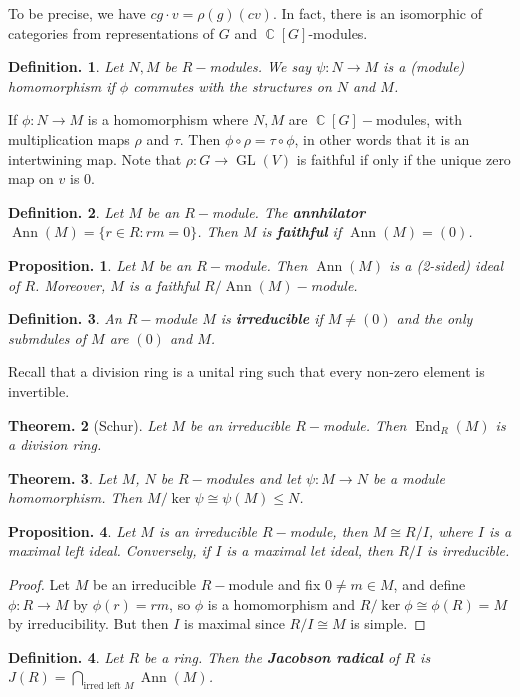 \documentclass[11pt, a4paper]{memoir}
\DeclareMathOperator{\C}{{\mathbb{C}}}
\theoremstyle{change}
\newtheorem{theorem}{Theorem.}[section]
\newtheorem{proposition}[theorem]{Proposition.}
\theoremstyle{plain}
\theoremstyle{nonumberplain}
\newtheorem{definition}{Definition.}
\newtheorem{proof}{Proof}
\DeclareMathOperator{\Ann}{Ann}
\DeclareMathOperator{\End}{End}
\DeclareMathOperator{\GL}{GL}
\numberwithin{equation}{section}
\begin{document}
To be precise, we have $c g\cdot v=\rho(g)(c v)$.
In fact, there is an isomorphic of categories from representations of $G$ and $\C[G]$-modules.
\begin{definition}
    Let $N,M$ be $R-$modules.
    We say $\psi:N\to M$ is a (module) homomorphism if $\phi$ commutes with the structures on $N$ and $M$.
\end{definition}
If $\phi:N\to M$ is a homomorphism where $N,M$ are $\C[G]-$modules, with multiplication maps $\rho$ and $\tau$.
Then $\phi\circ\rho=\tau\circ\phi$, in other words that it is an intertwining map.
Note that $\rho:G\to\GL(V)$ is faithful if only if the unique zero map on $v$ is $0$.
\begin{definition}
    Let $M$ be an $R-$module.
    The \textbf{annhilator} $\Ann(M)=\{r\in R:rm=0\}$.
    Then $M$ is \textbf{faithful} if $\Ann(M)=(0)$.
\end{definition}
\begin{proposition}
    Let $M$ be an $R-$module.
    Then $\Ann(M)$ is a (2-sided) ideal of $R$.
    Moreover, $M$ is a faithful $R/\Ann(M)-$module.
\end{proposition}
\begin{definition}
    An $R-$module $M$ is \textbf{irreducible} if $M\neq (0)$ and the only submdules of $M$ are $(0)$ and $M$.
\end{definition}
Recall that a division ring is a unital ring such that every non-zero element is invertible.
\begin{theorem}[Schur]
    Let $M$ be an irreducible $R-$module.
    Then $\End_R(M)$ is a division ring.
\end{theorem}
\begin{theorem}
    Let $M$, $N$ be $R-$modules and let $\psi:M\to N$ be a module homomorphism.
    Then $M/\ker\psi\cong\psi(M)\leq N$.
\end{theorem}
\begin{proposition}
    Let $M$ is an irreducible $R-$module, then $M\cong R/I$, where $I$ is a maximal left ideal.
    Conversely, if $I$ is a maximal let ideal, then $R/I$ is irreducible.
\end{proposition}
\begin{proof}
    Let $M$ be an irreducible $R-$module and fix $0\neq m\in M$, and define $\phi:R\to M$ by $\phi(r)=rm$, so $\phi$ is a homomorphism and $R/\ker\phi\cong\phi(R)=M$ by irreducibility.
    But then $I$ is maximal since $R/I\cong M$ is simple.
\end{proof}
\begin{definition}
    Let $R$ be a ring.
    Then the \textbf{Jacobson radical} of $R$ is $J(R)=\bigcap_{\text{irred left }M}\Ann(M)$.
\end{definition}
\end{document}

